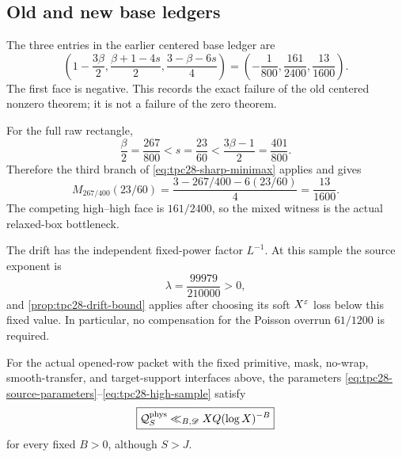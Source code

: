 \subsection{Old and new base ledgers}

The three entries in the earlier centered base ledger are
\begin{equation}
 \left(
 1-\frac{3\beta}{2},
 \frac{\beta+1-4s}{2},
 \frac{3-\beta-6s}{4}
 \right)
 =\left(
 -\frac1{800},
 \frac{161}{2400},
 \frac{13}{1600}
 \right).
 \label{eq:tpc28-old-ledger-sample}
\end{equation}
The first face is negative.  This records the exact failure of the old
centered nonzero theorem; it is not a failure of the zero theorem.

For the full raw rectangle,
\begin{equation}
 \frac\beta2=\frac{267}{800}
 <s=\frac{23}{60}
 <\frac{3\beta-1}{2}=\frac{401}{800}.
 \label{eq:tpc28-base-branch}
\end{equation}
Therefore the third branch of
\eqref{eq:tpc28-sharp-minimax} applies and gives
\begin{equation}
 \boxed{
 M_{267/400}(23/60)
 =\frac{3-267/400-6(23/60)}4
 =\frac{13}{1600}.}
 \label{eq:tpc28-base-saving}
\end{equation}
The competing high--high face is $161/2400$, so the mixed witness is
the actual relaxed-box bottleneck.

The drift has the independent fixed-power factor $L^{-1}$.  At this
sample the source exponent is
\begin{equation}
 \lambda=\frac{99979}{210000}>0,
 \label{eq:tpc28-drift-source-saving}
\end{equation}
and \cref{prop:tpc28-drift-bound} applies after choosing its soft
$X^\varepsilon$ loss below this fixed value.  In particular, no compensation
for the Poisson overrun $61/1200$ is required.

\begin{corollary}
\label{cor:tpc28-high-base}
For the actual opened-row packet with the fixed primitive, mask,
no-wrap, smooth-transfer, and target-support interfaces above, the
parameters \eqref{eq:tpc28-source-parameters}--\eqref{eq:tpc28-high-sample}
satisfy
\begin{equation}
 \boxed{
 \mathcal Q_S^{\rm phys}
 \ll_{B,\mathscr D}XQ(\log X)^{-B}}
 \label{eq:tpc28-high-base-closure}
\end{equation}
for every fixed $B>0$, although $S>J$.
\end{corollary}


